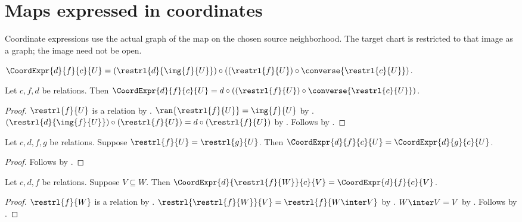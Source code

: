 \section{Maps expressed in coordinates}



Coordinate expressions use the actual graph of the map on the chosen source
neighborhood. The target chart is restricted to that image as a graph; the
image need not be open.

\begin{definition}\label{coordinate_expression}
    $\CoordExpr{d}{f}{c}{U}
        =(\restrl{d}{\img{f}{U}})\circ((\restrl{f}{U})\circ\converse{\restrl{c}{U}})$.
\end{definition}

\begin{theorem}\label{coordinate_expression_normalization}
    Let $c,f,d$ be relations.
    Then $\CoordExpr{d}{f}{c}{U}=d\circ((\restrl{f}{U})\circ\converse{\restrl{c}{U}})$.
\end{theorem}
\begin{proof}
    $\restrl{f}{U}$ is a relation by .
    $\ran{\restrl{f}{U}}=\img{f}{U}$ by .
    $(\restrl{d}{\img{f}{U}})\circ(\restrl{f}{U})=d\circ(\restrl{f}{U})$ by
        .
    Follows by .
\end{proof}

\begin{theorem}\label{coordinate_expression_agreement}
    Let $c,d,f,g$ be relations.
    Suppose $\restrl{f}{U}=\restrl{g}{U}$.
    Then $\CoordExpr{d}{f}{c}{U}=\CoordExpr{d}{g}{c}{U}$.
\end{theorem}
\begin{proof}
    Follows by .
\end{proof}

\begin{theorem}\label{coordinate_expression_restrict_map}
    Let $c,d,f$ be relations.
    Suppose $V\subseteq W$.
    Then $\CoordExpr{d}{\restrl{f}{W}}{c}{V}=\CoordExpr{d}{f}{c}{V}$.
\end{theorem}
\begin{proof}
    $\restrl{f}{W}$ is a relation by .
    $\restrl{\restrl{f}{W}}{V}=\restrl{f}{W\inter V}$ by .
    $W\inter V=V$ by .
    Follows by .
\end{proof}

